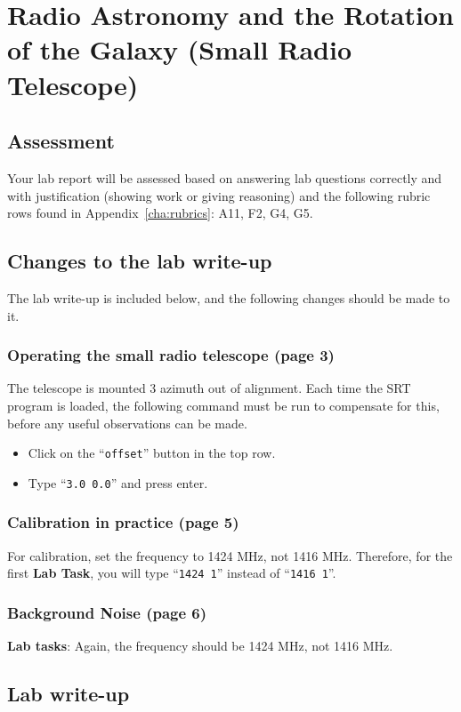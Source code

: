 \chapter{Radio Astronomy and the Rotation of the Galaxy (Small Radio Telescope)}

\section{Assessment}

Your lab report will be assessed based on answering lab questions correctly and with justification (showing work or giving reasoning) and the following rubric rows found in Appendix~\ref{cha:rubrics}: A11, F2, G4, G5.

\section{Changes to the lab write-up}

The lab write-up is included below, and the following changes should be made to it.

\subsection{Operating the small radio telescope (page 3)}

The telescope is mounted 3\textdegree{} azimuth out of alignment. Each time the SRT program is loaded, the following command must be run to compensate for this, before any useful observations can be made.

\begin{itemize}
	\item Click on the ``\texttt{offset}'' button in the top row.
	
	\item Type ``\texttt{3.0 0.0}'' and press enter.
\end{itemize}

\subsection{Calibration in practice (page 5)}

For calibration, set the frequency to 1424 MHz, not 1416 MHz. Therefore, for the first \textbf{Lab Task}, you will type ``\texttt{1424 1}'' instead of ``\texttt{1416 1}''.

\subsection{Background Noise (page 6)}

\textbf{Lab tasks}: Again, the frequency should be 1424 MHz, not 1416 MHz.

\section{Lab write-up}

